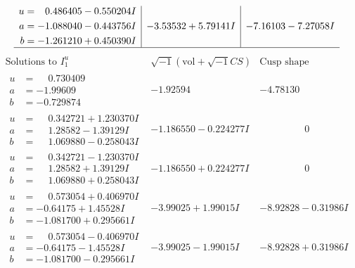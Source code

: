 \documentclass[1p]{elsarticle_modified}
\theoremstyle{definition}
\newcommand{\I}{\sqrt{-1}}
\begin{document}
$$\begin{array}{c|c|c}
\begin{aligned}
u &= \phantom{-}0.486405 - 0.550204 I \\
a &= -1.088040 - 0.443756 I \\
b &= -1.261210 + 0.450390 I\end{aligned}
 & -3.53532 + 5.79141 I & -7.16103 - 7.27058 I\\
 \hline 
 \end{array}$$\newpage$$\begin{array}{c|c|c}  
\text{Solutions to }I^u_{1}& \I (\text{vol} + \sqrt{-1}CS) & \text{Cusp shape}\\
 \hline 
\begin{aligned}
u &= \phantom{-}0.730409\phantom{ +0.000000I} \\
a &= -1.99609\phantom{ +0.000000I} \\
b &= -0.729874\phantom{ +0.000000I}\end{aligned}
 & -1.92594\phantom{ +0.000000I} & -4.78130\phantom{ +0.000000I} \\ \hline\begin{aligned}
u &= \phantom{-}0.342721 + 1.230370 I \\
a &= \phantom{-}1.28582 - 1.39129 I \\
b &= \phantom{-}1.069880 - 0.258043 I\end{aligned}
 & -1.186550 - 0.224277 I & \phantom{-0.000000 } 0 \\ \hline\begin{aligned}
u &= \phantom{-}0.342721 - 1.230370 I \\
a &= \phantom{-}1.28582 + 1.39129 I \\
b &= \phantom{-}1.069880 + 0.258043 I\end{aligned}
 & -1.186550 + 0.224277 I & \phantom{-0.000000 } 0 \\ \hline\begin{aligned}
u &= \phantom{-}0.573054 + 0.406970 I \\
a &= -0.64175 + 1.45528 I \\
b &= -1.081700 + 0.295661 I\end{aligned}
 & -3.99025 + 1.99015 I & -8.92828 - 0.31986 I \\ \hline\begin{aligned}
u &= \phantom{-}0.573054 - 0.406970 I \\
a &= -0.64175 - 1.45528 I \\
b &= -1.081700 - 0.295661 I\end{aligned}
 & -3.99025 - 1.99015 I & -8.92828 + 0.31986 I \\ \hline\begin{aligned}

\end{aligned}
\end{array}$$
\end{document}
